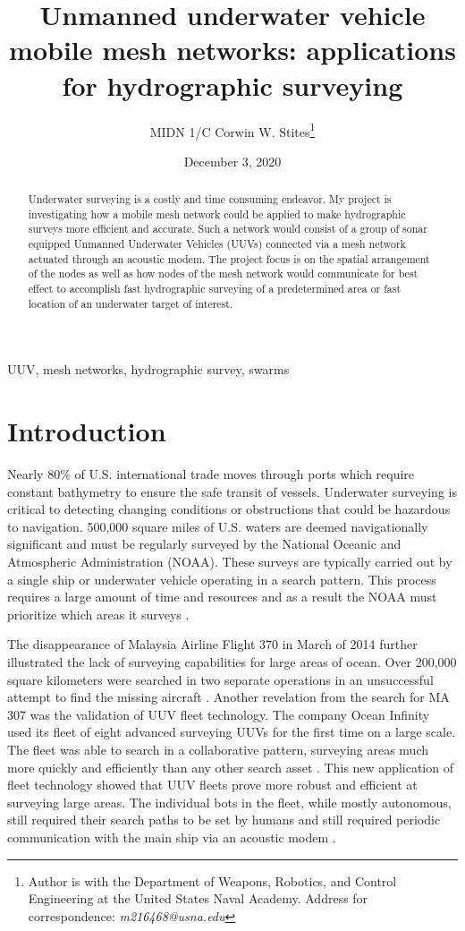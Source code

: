 \documentclass[twocolumn,10pt]{IEEEtran}
\title{Unmanned underwater vehicle mobile mesh networks: applications for hydrographic surveying}
\author{MIDN 1/C Corwin W. Stites\thanks{Author is with the Department of Weapons, Robotics, and Control Engineering at the United States Naval Academy. Address for correspondence: \emph{m216468@usna.edu}}}
\date{December 3, 2020}
\begin{document}
\maketitle

\begin{abstract}
Underwater surveying is a costly and time consuming endeavor. My project is investigating how a mobile mesh network could be applied to make hydrographic surveys more efficient and accurate. Such a network would consist of a group of sonar equipped Unmanned Underwater Vehicles (UUVs) connected via a mesh network actuated through an acoustic modem. The project focus is on the spatial arrangement of the nodes as well as how nodes of the mesh network would communicate for best effect to accomplish fast hydrographic surveying of a predetermined area or fast location of an underwater target of interest.  
\end{abstract}

\begin{IEEEkeywords}
UUV, mesh networks, hydrographic survey, swarms
\end{IEEEkeywords}

\section{Introduction}
Nearly 80\% of U.S. international trade moves through ports which require constant bathymetry to ensure the safe transit of vessels. Underwater surveying is critical to detecting changing conditions or obstructions that could be hazardous to navigation. 500,000 square miles of U.S. waters are deemed navigationally significant and must be regularly surveyed by the National Oceanic and Atmospheric Administration (NOAA). These surveys are typically carried out by a single ship or underwater vehicle operating in a search pattern. This process requires a large amount of time and resources and as a result the NOAA must prioritize which areas it surveys \cite{noaa2009hydrographic}.
	
The disappearance of Malaysia Airline Flight 370 in March of 2014 further illustrated the lack of surveying capabilities for large areas of ocean. Over 200,000 square kilometers were searched in two separate operations in an unsuccessful attempt to find the missing aircraft \cite{australia2018joint}. Another revelation from the search for MA 307 was the validation of UUV fleet technology. The company Ocean Infinity used its fleet of eight advanced surveying UUVs for the first time on a large scale. The fleet was able to search in a collaborative pattern, surveying areas much more quickly and efficiently than any other search asset \cite{economist2018fantastical}. This new application of fleet technology showed that UUV fleets prove more robust and efficient at surveying large areas. The individual bots in the fleet, while mostly autonomous, still required their search paths to be set by humans and still required periodic communication with the main ship via an acoustic modem \cite{haun2017ocean}. 	
\end{document}
